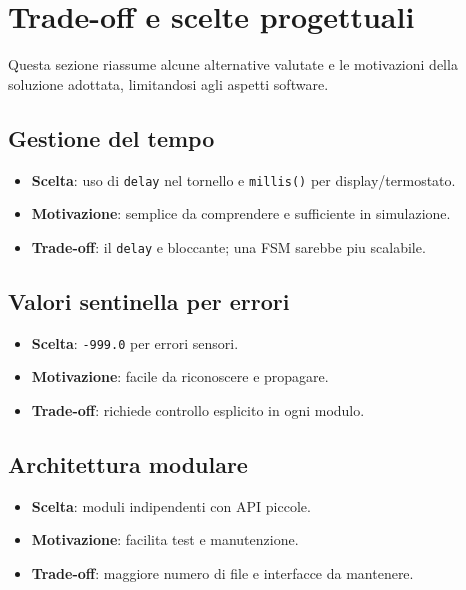 \chapter{Trade-off e scelte progettuali}

Questa sezione riassume alcune alternative valutate e le motivazioni della soluzione adottata, limitandosi agli aspetti software.

\section{Gestione del tempo}
\begin{itemize}
  \item \textbf{Scelta}: uso di \texttt{delay} nel tornello e \texttt{millis()} per display/termostato.
  \item \textbf{Motivazione}: semplice da comprendere e sufficiente in simulazione.
  \item \textbf{Trade-off}: il \texttt{delay} e bloccante; una FSM sarebbe piu scalabile.
\end{itemize}

\section{Valori sentinella per errori}
\begin{itemize}
  \item \textbf{Scelta}: \texttt{-999.0} per errori sensori.
  \item \textbf{Motivazione}: facile da riconoscere e propagare.
  \item \textbf{Trade-off}: richiede controllo esplicito in ogni modulo.
\end{itemize}

\section{Architettura modulare}
\begin{itemize}
  \item \textbf{Scelta}: moduli indipendenti con API piccole.
  \item \textbf{Motivazione}: facilita test e manutenzione.
  \item \textbf{Trade-off}: maggiore numero di file e interfacce da mantenere.
\end{itemize}

